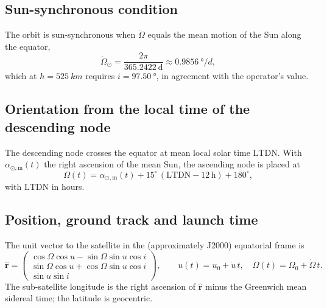 \documentclass[a4paper,fleqn]{cas-sc}
\newif\ifshowtodos
\newcommand{\todo}[1]{\ifshowtodos{\color{red!70!black}\textbf{[TODO:} #1\textbf{]}}\fi}
\newcommand{\vect}[1]{\hat{\mathbf{#1}}}
\newcommand{\LTDN}{\mathrm{LTDN}}
\newcommand{\dg}{^\circ}   %
\begin{document}
\subsection{Sun-synchronous condition}
The orbit is sun-synchronous when $\dot\Omega$ equals the mean motion of the
Sun along the equator,
\begin{equation}
  \dot\Omega_{\odot}=\frac{2\pi}{365.2422\ \mathrm{d}}
  \approx \SI{0.9856}{\degree\per d},
  \label{eq:sso}
\end{equation}
which at $h=\SI{525}{km}$ requires $i=\SI{97.50}{\degree}$, in agreement with
the operator's value.

\subsection{Orientation from the local time of the descending node}
The descending node crosses the equator at mean local solar time
$\LTDN$. With $\alpha_{\odot,\mathrm{m}}(t)$ the right ascension of the mean
Sun, the ascending node is placed at
\begin{equation}
  \Omega(t) = \alpha_{\odot,\mathrm{m}}(t) + 15\dg\,(\LTDN-12\,\mathrm{h}) + 180\dg ,
  \label{eq:raan}
\end{equation}
with $\LTDN$ in hours. \todo{State the low-precision expressions used for
$\alpha_{\odot,\mathrm{m}}$, the true Sun and GMST, e.g.\ from
\citet{Meeus1998}.}

\subsection{Position, ground track and launch time}
The unit vector to the satellite in the (approximately J2000) equatorial frame
is
\begin{equation}
  \vect{r} =
  \begin{pmatrix}
    \cos\Omega\cos u-\sin\Omega\sin u\cos i\\
    \sin\Omega\cos u+\cos\Omega\sin u\cos i\\
    \sin u\sin i
  \end{pmatrix},
  \qquad
  u(t)=u_0+\dot u\,t,\quad \Omega(t)=\Omega_0+\dot\Omega\,t .
  \label{eq:rhat}
\end{equation}
The sub-satellite longitude is the right ascension of $\vect{r}$ minus the
Greenwich mean sidereal time; the latitude is geocentric.
\end{document}
